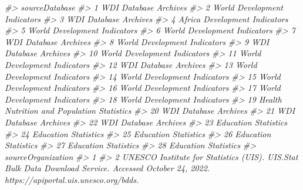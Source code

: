 \documentclass[
  xelatex, ja=standard]{bxjsbook}
\newenvironment{Shaded}{\begin{snugshade}}{\end{snugshade}}
\newcommand{\CommentTok}[1]{\textcolor[rgb]{0.56,0.35,0.01}{\textit{#1}}}
\theoremstyle{definition}
\theoremstyle{definition}
\theoremstyle{definition}
\theoremstyle{definition}
\theoremstyle{remark}
\begin{document}
\begin{Shaded}
\begin{Highlighting}[]
\CommentTok{\#\textgreater{}                                sourceDatabase}
\CommentTok{\#\textgreater{} 1                       WDI Database Archives}
\CommentTok{\#\textgreater{} 2                World Development Indicators}
\CommentTok{\#\textgreater{} 3                       WDI Database Archives}
\CommentTok{\#\textgreater{} 4               Africa Development Indicators}
\CommentTok{\#\textgreater{} 5                World Development Indicators}
\CommentTok{\#\textgreater{} 6                World Development Indicators}
\CommentTok{\#\textgreater{} 7                       WDI Database Archives}
\CommentTok{\#\textgreater{} 8                World Development Indicators}
\CommentTok{\#\textgreater{} 9                       WDI Database Archives}
\CommentTok{\#\textgreater{} 10               World Development Indicators}
\CommentTok{\#\textgreater{} 11               World Development Indicators}
\CommentTok{\#\textgreater{} 12                      WDI Database Archives}
\CommentTok{\#\textgreater{} 13               World Development Indicators}
\CommentTok{\#\textgreater{} 14               World Development Indicators}
\CommentTok{\#\textgreater{} 15               World Development Indicators}
\CommentTok{\#\textgreater{} 16               World Development Indicators}
\CommentTok{\#\textgreater{} 17               World Development Indicators}
\CommentTok{\#\textgreater{} 18               World Development Indicators}
\CommentTok{\#\textgreater{} 19 Health Nutrition and Population Statistics}
\CommentTok{\#\textgreater{} 20                      WDI Database Archives}
\CommentTok{\#\textgreater{} 21                      WDI Database Archives}
\CommentTok{\#\textgreater{} 22                      WDI Database Archives}
\CommentTok{\#\textgreater{} 23                       Education Statistics}
\CommentTok{\#\textgreater{} 24                       Education Statistics}
\CommentTok{\#\textgreater{} 25                       Education Statistics}
\CommentTok{\#\textgreater{} 26                       Education Statistics}
\CommentTok{\#\textgreater{} 27                       Education Statistics}
\CommentTok{\#\textgreater{} 28                       Education Statistics}
\CommentTok{\#\textgreater{}                                                                                                                               sourceOrganization}
\CommentTok{\#\textgreater{} 1                                                                                                                                               }
\CommentTok{\#\textgreater{} 2  UNESCO Institute for Statistics (UIS). UIS.Stat Bulk Data Download Service. Accessed October 24, 2022. https://apiportal.uis.unesco.org/bdds.}

\end{Highlighting}
\end{Shaded}
\end{document}
